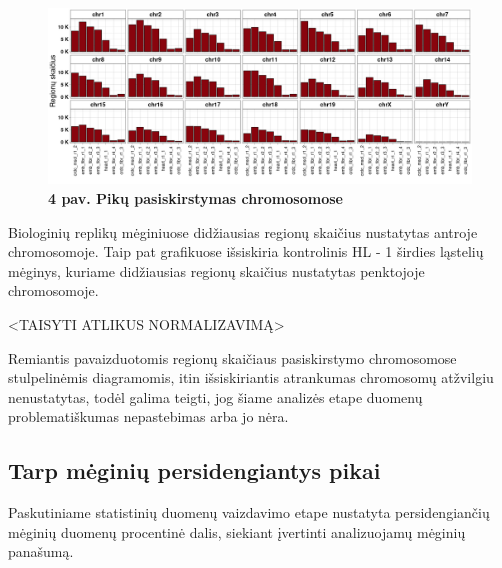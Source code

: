 \documentclass[12pt]{article}
\begin{document}
\begin{figure}[htb]
    \begin{center}
        \includegraphics[width=1\linewidth]{../Figures/peak_counts_by_chr.png}
        \vspace{-2\baselineskip}
        \caption*{\small\textbf{4 pav. Pikų pasiskirstymas chromosomose}}
    \end{center}
\end{figure}

Biologinių replikų mėginiuose didžiausias regionų skaičius nustatytas antroje
chromosomoje. Taip pat grafikuose išsiskiria kontrolinis HL - 1 širdies
ląstelių mėginys, kuriame didžiausias regionų skaičius nustatytas penktojoje
chromosomoje.

<TAISYTI ATLIKUS NORMALIZAVIMĄ>

Remiantis pavaizduotomis regionų skaičiaus pasiskirstymo chromosomose
stulpelinėmis diagramomis, itin išsiskiriantis atrankumas chromosomų atžvilgiu
nenustatytas, todėl galima teigti, jog šiame analizės etape duomenų
problematiškumas nepastebimas arba jo nėra.

\newpage


\subsection{Tarp mėginių persidengiantys pikai}
Paskutiniame statistinių duomenų vaizdavimo etape nustatyta persidengiančių
mėginių duomenų procentinė dalis, siekiant įvertinti analizuojamų mėginių
panašumą.
\end{document}

